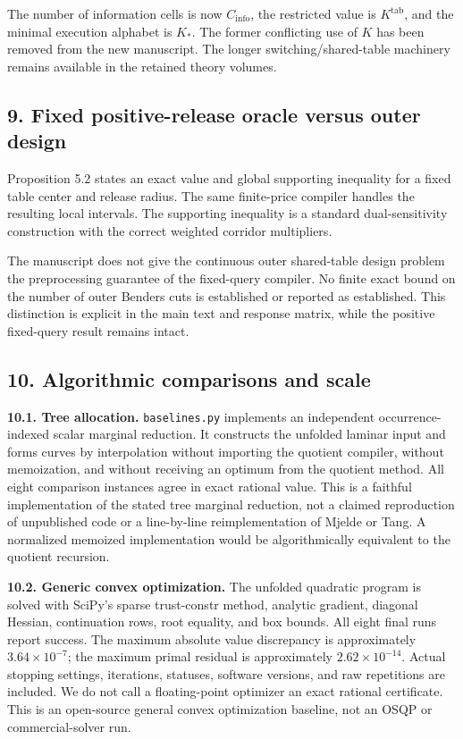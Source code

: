\documentclass[
  11pt,
]{article}
\begin{document}
The number of information cells is now \(C_{\mathrm{info}}\), the
restricted value is \(K^{\mathrm{tab}}\), and the minimal execution
alphabet is \(K_*\). The former conflicting use of \(K\) has been
removed from the new manuscript. The longer switching/shared-table
machinery remains available in the retained theory volumes.

\subsection{9. Fixed positive-release oracle versus outer
design}\label{fixed-positive-release-oracle-versus-outer-design}

Proposition 5.2 states an exact value and global supporting inequality
for a fixed table center and release radius. The same finite-price
compiler handles the resulting local intervals. The supporting
inequality is a standard dual-sensitivity construction with the correct
weighted corridor multipliers.

The manuscript does not give the continuous outer shared-table design
problem the preprocessing guarantee of the fixed-query compiler. No
finite exact bound on the number of outer Benders cuts is established or
reported as established. This distinction is explicit in the main text
and response matrix, while the positive fixed-query result remains
intact.

\subsection{10. Algorithmic comparisons and
scale}\label{algorithmic-comparisons-and-scale}

\textbf{10.1. Tree allocation.} \texttt{baselines.py} implements an
independent occurrence-indexed scalar marginal reduction. It constructs
the unfolded laminar input and forms curves by interpolation without
importing the quotient compiler, without memoization, and without
receiving an optimum from the quotient method. All eight comparison
instances agree in exact rational value. This is a faithful
implementation of the stated tree marginal reduction, not a claimed
reproduction of unpublished code or a line-by-line reimplementation of
Mjelde or Tang. A normalized memoized implementation would be
algorithmically equivalent to the quotient recursion.

\textbf{10.2. Generic convex optimization.} The unfolded quadratic
program is solved with SciPy's sparse trust-constr method, analytic
gradient, diagonal Hessian, continuation rows, root equality, and box
bounds. All eight final runs report success. The maximum absolute value
discrepancy is approximately \(3.64\times10^{-7}\); the maximum primal
residual is approximately \(2.62\times10^{-14}\). Actual stopping
settings, iterations, statuses, software versions, and raw repetitions
are included. We do not call a floating-point optimizer an exact
rational certificate. This is an open-source general convex optimization
baseline, not an OSQP or commercial-solver run.
\end{document}
